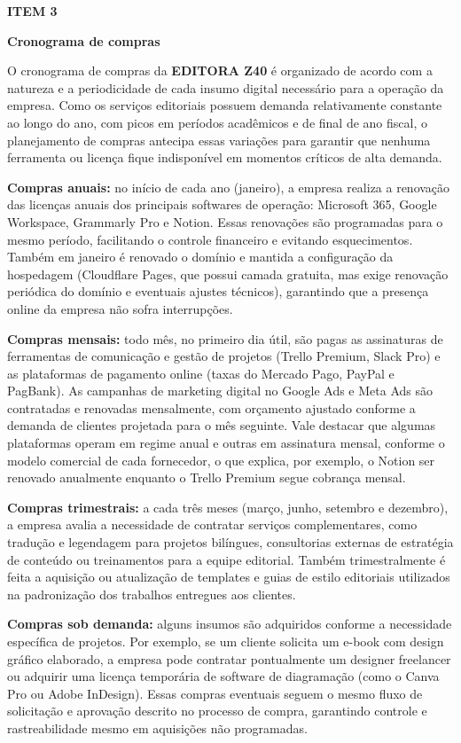 \documentclass[10pt,a4paper]{article}
\newcommand{\labelfont}{\fontsize{5.8}{7.5}\selectfont\bfseries\addfontfeatures{LetterSpace=15}}
\newcommand{\headingfont}{\fontsize{9.8}{12}\selectfont\bfseries\color{navy}}
\newcommand{\separador}{\vspace{16pt}{\color{rulegray}\rule{\linewidth}{0.6pt}}\vspace{10pt}}
\newcommand{\itemh}[2]{\needspace{6\baselineskip}%
  {\labelfont\color{graylab}ITEM #1}\par\vspace{5pt}%
  {\headingfont #2}\par\vspace{8pt}}
\begin{document}
\separador
\itemh{3}{Cronograma de compras}

O cronograma de compras da \textbf{EDITORA Z40} é organizado de acordo com a natureza e a periodicidade de cada insumo digital necessário para a operação da empresa. Como os serviços editoriais possuem demanda relativamente constante ao longo do ano, com picos em períodos acadêmicos e de final de ano fiscal, o planejamento de compras antecipa essas variações para garantir que nenhuma ferramenta ou licença fique indisponível em momentos críticos de alta demanda.

\textbf{Compras anuais:} no início de cada ano (janeiro), a empresa realiza a renovação das licenças anuais dos principais softwares de operação: Microsoft 365, Google Workspace, Grammarly Pro e Notion. Essas renovações são programadas para o mesmo período, facilitando o controle financeiro e evitando esquecimentos. Também em janeiro é renovado o domínio e mantida a configuração da hospedagem (Cloudflare Pages, que possui camada gratuita, mas exige renovação periódica do domínio e eventuais ajustes técnicos), garantindo que a presença online da empresa não sofra interrupções.

\textbf{Compras mensais:} todo mês, no primeiro dia útil, são pagas as assinaturas de ferramentas de comunicação e gestão de projetos (Trello Premium, Slack Pro) e as plataformas de pagamento online (taxas do Mercado Pago, PayPal e PagBank). As campanhas de marketing digital no Google Ads e Meta Ads são contratadas e renovadas mensalmente, com orçamento ajustado conforme a demanda de clientes projetada para o mês seguinte. Vale destacar que algumas plataformas operam em regime anual e outras em assinatura mensal, conforme o modelo comercial de cada fornecedor, o que explica, por exemplo, o Notion ser renovado anualmente enquanto o Trello Premium segue cobrança mensal.

\textbf{Compras trimestrais:} a cada três meses (março, junho, setembro e dezembro), a empresa avalia a necessidade de contratar serviços complementares, como tradução e legendagem para projetos bilíngues, consultorias externas de estratégia de conteúdo ou treinamentos para a equipe editorial. Também trimestralmente é feita a aquisição ou atualização de templates e guias de estilo editoriais utilizados na padronização dos trabalhos entregues aos clientes.

\textbf{Compras sob demanda:} alguns insumos são adquiridos conforme a necessidade específica de projetos. Por exemplo, se um cliente solicita um e-book com design gráfico elaborado, a empresa pode contratar pontualmente um designer freelancer ou adquirir uma licença temporária de software de diagramação (como o Canva Pro ou Adobe InDesign). Essas compras eventuais seguem o mesmo fluxo de solicitação e aprovação descrito no processo de compra, garantindo controle e rastreabilidade mesmo em aquisições não programadas.
\end{document}
